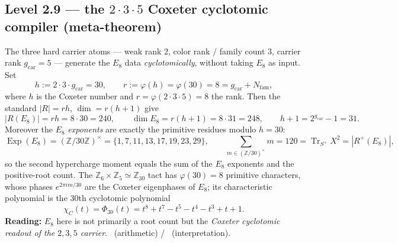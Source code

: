 \documentclass[11pt,a4paper]{article}
\newcommand{\gcar}{g_{\mathrm{car}}}
\newcommand{\Nfam}{N_{\mathrm{fam}}}
\theoremstyle{definition}
\begin{document}
\subsection{Level 2.9 --- the $2{\cdot}3{\cdot}5$ Coxeter cyclotomic compiler (meta-theorem)}
The three hard carrier atoms --- weak rank $2$, color rank / family count $3$, carrier rank
$\gcar=5$ --- generate the $E_8$ data \emph{cyclotomically}, without taking $E_8$ as input. Set
\begin{equation}
  \boxed{\ h:=2\cdot3\cdot\gcar=30,\qquad r:=\varphi(h)=\varphi(30)=8=\gcar+\Nfam,\ }
\end{equation}
where $h$ is the Coxeter number and $r=\varphi(2{\cdot}3{\cdot}5)=8$ the rank. Then the standard
$|R|=rh$, $\dim=r(h{+}1)$ give
\begin{equation}
  |R(E_8)|=rh=8\cdot30=240,\qquad \dim E_8=r(h+1)=8\cdot31=248,\qquad h+1=2^{\gcar}-1=31 .
\end{equation}
Moreover the $E_8$ \emph{exponents} are exactly the primitive residues modulo $h=30$:
\begin{equation}
  \operatorname{Exp}(E_8)=(\mathbb Z/30\mathbb Z)^\times=\{1,7,11,13,17,19,23,29\},\qquad
  \sum_{m\in(\mathbb Z/30)^\times}\!\! m=120=\operatorname{Tr}_{S^+}X^2=|R^+(E_8)|,
\end{equation}
so the second hypercharge moment equals the sum of the $E_8$ exponents and the positive-root count.
The $\mathbb Z_6\times\mathbb Z_5\simeq\mathbb Z_{30}$ tact has $\varphi(30)=8$ primitive characters,
whose phases $e^{2\pi i m/30}$ are the Coxeter eigenphases of $E_8$; its characteristic polynomial is
the $30$th cyclotomic polynomial
\begin{equation}
  \chi_C(t)=\Phi_{30}(t)=t^8+t^7-t^5-t^4-t^3+t+1 .
\end{equation}
\textbf{Reading:} $E_8$ here is not primarily a root count but the \emph{Coxeter cyclotomic readout of
the $2,3,5$ carrier}. \mE\ (arithmetic) / \mC\ (interpretation).
\end{document}
